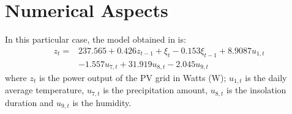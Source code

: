 \section{Numerical Aspects}\label{sec:numAsp}
In this particular case, the model obtained in \cite{li2014armax} is:
\begin{equation}
\begin{aligned} z_{t}=& 237.565+0.426z_{t-1}+\xi_{t}-0.153 \xi_{t-1}+8.9087u_{1, t} \\ &-1.557 u_{7, t}+31.919 u_{8, t}-2.045u_{9, t}
\end{aligned}
\end{equation}
where $z_t$ is the power output of the PV grid in Watts (W); $u_{1,t}$ is the daily average temperature, $u_{7,t}$ is the precipitation amount, $u_{8,t}$ is the insolation duration and $u_{9,t}$ is the humidity.
